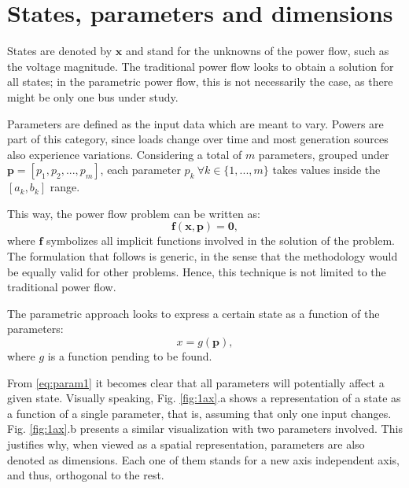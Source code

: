 \section{States, parameters and dimensions}
States are denoted by $\mathbf{x}$ and stand for the unknowns of the power flow, such as the voltage magnitude. The traditional power flow looks to obtain a solution for all states; in the parametric power flow, this is not necessarily the case, as there might be only one bus under study. 

Parameters are defined as the input data which are meant to vary. Powers are part of this category, since loads change over time and most generation sources also experience variations. Considering a total of $m$ parameters, grouped under $\mathbf{p} = [p_1, p_2, ..., p_m]$, each parameter $p_k \ \forall k \in \{1, ..., m\}$ takes values inside the $[a_k, b_k]$ range. 

This way, the power flow problem can be written as:
\begin{equation}
  \mathbf{f}(\mathbf{x}, \mathbf{p}) = \mathbf{0},
  \label{eq:power1}
\end{equation}
where $\mathbf{f}$ symbolizes all implicit functions involved in the solution of the problem. The formulation that follows is generic, in the sense that the methodology would be equally valid for other problems. Hence, this technique is not limited to the traditional power flow. 

The parametric approach looks to express a certain state as a function of the parameters:
\begin{equation}
  x = g(\mathbf{p}), 
  \label{eq:param1}
\end{equation}
where $g$ is a function pending to be found. 

From \eqref{eq:param1} it becomes clear that all parameters will potentially affect a given state. Visually speaking, Fig. \ref{fig:1ax}.a shows a representation of a state as a function of a single parameter, that is, assuming that only one input changes. Fig. \ref{fig:1ax}.b presents a similar visualization with two parameters involved. This justifies why, when viewed as a spatial representation, parameters are also denoted as dimensions. Each one of them stands for a new axis independent axis, and thus, orthogonal to the rest. 



